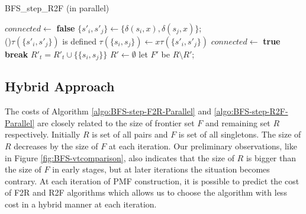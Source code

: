 \documentclass[12pt]{article}
\begin{document}
\begin{algorithm}[ht]
	\caption{BFS\_step\_R2F (in parallel)}
	\label{algo:BFS-step-R2F-Parallel}
	
	
		{
			$connected  \longleftarrow $ {\bf false}\;
			{
				$\{ s'_i, s'_j \}\longleftarrow \{ \delta(s_i,x),\delta(s_j,x) \}$; \\ 

				\If(){$\tau(\{ s'_i, s'_j \})$ is defined}
				{
					$\tau( \{ s_i, s_j\}) \longleftarrow x \tau(\{ s'_i, s'_j \})$\;
					$connected  \longleftarrow $ {\bf true}\;
					{\bf break}\;
				}
			}
			{
					$R'_t = R'_t \cup \{ \{ s_i, s_j \} \} $\;
			}
		}
		$R' \longleftarrow \emptyset$\;
	let $F'$ be $R \setminus R'$;
\end{algorithm}


\subsection{Hybrid Approach}
\label{sec:BFS-Hybrid-parallel}
The costs of Algorithm \ref{algo:BFS-step-F2R-Parallel} and \ref{algo:BFS-step-R2F-Parallel} are closely related to the size of frontier set $F$ and remaining set $R$ respectively. Initially $R$ is set of all pairs and $F$ is set of all singletons. The size of $R$ decreases by the size of $F$ at each iteration. Our preliminary observations, like in Figure \ref{fig:BFS-vtcomparison}, also indicates that the size of $R$ is bigger than the size of $F$ in early stages, but at later iterations the situation becomes contrary. At each iteration of PMF construction, it is possible to predict the cost of F2R and R2F algorithms which allows us to choose the algorithm with less cost in a hybrid manner at each iteration. 
\end{document}
